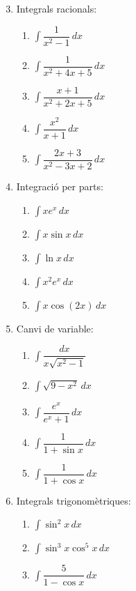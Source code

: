 \documentclass[12pt]{article}
\begin{document}
\begin{enumerate}[label=\arabic*.]
    \setcounter{enumi}{2}
    \item Integrals racionals:
    \begin{enumerate}[label=\alph*)]
        \item $\displaystyle \int \dfrac{1}{x^2-1}\,dx$
        \item $\displaystyle \int \dfrac{1}{x^2+4x+5}\,dx$
        \item $\displaystyle \int \dfrac{x+1}{x^2+2x+5}\,dx$
        \item $\displaystyle \int \dfrac{x^2}{x+1}\,dx$
        \item $\displaystyle \int \dfrac{2x+3}{x^2-3x+2}\,dx$
    \end{enumerate}

    \item Integració per parts:
    \begin{enumerate}[label=\alph*)]
        \item $\displaystyle \int x e^x\,dx$
        \item $\displaystyle \int x \sin x\,dx$
        \item $\displaystyle \int \ln x\,dx$
        \item $\displaystyle \int x^2 e^x\,dx$
        \item $\displaystyle \int x \cos(2x)\,dx$
    \end{enumerate}

    \item Canvi de variable:
    \begin{enumerate}[label=\alph*)]
        \item $\displaystyle \int \dfrac{dx}{x\sqrt{x^2-1}}$
        \item $\displaystyle \int \sqrt{9-x^2}\,dx$
        \item $\displaystyle \int \dfrac{e^x}{e^x+1}\,dx$
        \item $\displaystyle \int \dfrac{1}{1+\sin x}\,dx$
        \item $\displaystyle \int \dfrac{1}{1+\cos x}\,dx$
    \end{enumerate}

    \item Integrals trigonomètriques:
    \begin{enumerate}[label=\alph*)]
        \item $\displaystyle \int \sin^2 x\,dx$
        \item $\displaystyle \int \sin^3 x \cos^5 x\,dx$
        \item $\displaystyle \int \dfrac{5}{1-\cos x}\,dx$
    \end{enumerate}
\end{enumerate}
\end{document}

